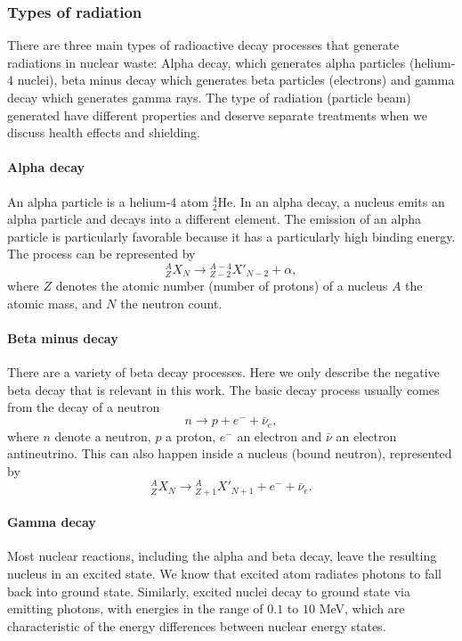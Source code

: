 \documentclass[nofootinbib,preprint,aps]{revtex4-1}
\begin{document}
        \subsubsection{Types of radiation}
        There are three main types of radioactive decay processes that generate radiations in nuclear waste: 
        Alpha decay, which generates alpha particles (helium-4 nuclei), beta minus decay which generates beta
        particles (electrons) and gamma decay which generates gamma rays.
        The type of radiation (particle beam) generated
        have different properties and deserve separate treatments when we discuss health effects and shielding.
        \paragraph{Alpha decay}
        An alpha particle is a helium-4 atom ${}^4_2$He. In an alpha decay, a nucleus emits an alpha
        particle and decays into a different element. The emission of an alpha particle is
        particularly favorable because it has a particularly
        high binding energy. The process can be represented by
        \begin{equation}
            {}^A_Z X_N \rightarrow {}^{A-4}_{Z-2}X'_{N-2} + \alpha,
        \end{equation}
        where $Z$ denotes the atomic number (number of protons) of a nucleus $A$ the atomic mass, and $N$ the
        neutron count.

        \paragraph{Beta minus decay}
        There are a variety of beta decay processes. Here we only describe the negative beta decay that is
        relevant in this work. The basic decay process usually comes from the decay of a neutron
        \begin{equation}
            n \rightarrow p + e^- + \bar{\nu}_e,
        \end{equation}
        where $n$ denote  a neutron, $p$ a proton, $e^-$ an electron and $\bar{\nu}$ an electron antineutrino.
        This can also happen inside a nucleus (bound neutron), represented by
        \begin{equation}
            {}^A_Z X_N \rightarrow {}^A_{Z+1} X'_{N+1} + e^- + \bar{\nu}_e.
        \end{equation}

        \paragraph{Gamma decay}
        Most nuclear reactions, including the alpha and beta decay, leave the resulting nucleus in
        an excited state.
        We know that excited atom radiates photons to fall back into ground state. Similarly, excited nuclei
        decay to ground state via emitting photons, with energies in the range
        of $0.1$ to $10$ MeV, which are characteristic of the energy differences between nuclear energy states.
    
\end{document}

